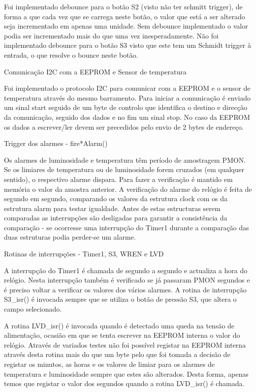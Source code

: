 \documentclass[a4paper,12pt]{article}
\begin{document}
Foi implementado debounce para o botão S2 (visto não ter schmitt trigger), de forma a que cada vez que se carrega neste botão, o valor que está a ser alterado seja incrementado em apenas uma unidade. Sem debounce implementado o valor podia ser incrementado mais do que uma vez inesperadamente. Não foi implementado debounce para o botão S3 visto que este tem um Schmidt trigger à entrada, o que resolve o bounce neste botão.


Comunicação I2C com a EEPROM e Sensor de temperatura

Foi implementado o protocolo I2C para comunicar com a EEPROM e o sensor de temperatura através do mesmo barramento. Para iniciar a comunicação é enviado um sinal start seguido de um byte de controlo que identifica o destino e direcção da comunicação, seguido dos dados e no fim um sinal stop. 
No caso da EEPROM os dados a escrever/ler devem ser precedidos pelo envio de 2 bytes de endereço.

Trigger dos alarmes - fire*Alarm()

Os alarmes de luminosidade e temperatura têm período de amostragem PMON. Se os limiares de temperatura ou de luminosidade forem cruzados (em qualquer sentido), o respectivo alarme dispara. Para fazer a verificação é mantido em memória o valor da amostra anterior.
A verificação do alarme do relógio é feita de segundo em segundo, comparando os valores da estrutura clock com os da estrutura alarm para testar igualdade. Antes de estas estructuras serem comparadas as interrupções são desligadas para garantir a consistência da comparação - se ocorresse uma interrupção do Timer1 durante a comparação das duas estruturas podia perder-se um alarme.

Rotinas de interrupções - Timer1, S3, WREN e LVD


A interrupção do Timer1 é chamada de segundo a segundo e actualiza a hora do relógio. Nesta interrupção também é verificado se já passaram PMON segundos e é preciso voltar a verificar os valores dos vários alarmes.
A rotina de interrupção S3_isr() é invocada sempre que se utiliza o botão de pressão S3, que altera o campo selecionado.

A rotina LVD_isr() é invocada quando é detectado uma queda na tensão de alimentação, ocasião em que se tenta escrever na EEPROM interna o valor do relógio. Através de variados testes não foi possível registar na EEPROM interna através desta rotina mais do que um byte pelo que foi tomada a decisão de registar os minutos, as horas e os valores de limiar para os alarmes de temperatura e luminosidade sempre que estes são alterados. Desta forma, apenas temos que registar o valor dos segundos quando a rotina LVD_isr() é chamada.
\end{document}
